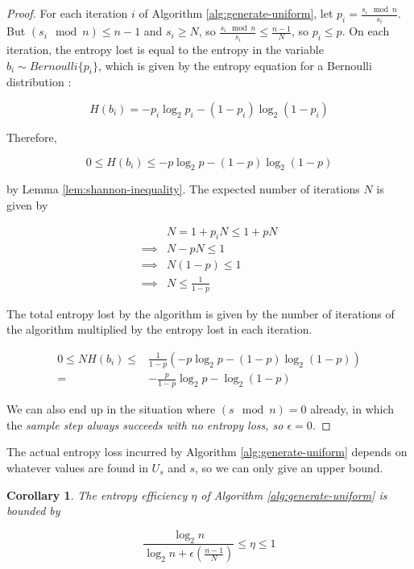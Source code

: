 \documentclass[12pt]{article}
\newtheorem{corollary}{Corollary}
\begin{document}
\begin{proof}
For each iteration $i$ of Algorithm \ref{alg:generate-uniform}, let $p_i = \frac{s_i \mod n}{s_i}$. But $(s_i \mod n) \le n-1$ and $s_i \ge N$, so $\frac{s_i \mod n}{s_i} \le \frac{n-1}{N}$, so $p_i \le p$. On each iteration, the entropy lost is equal to the entropy in the variable $b_i \sim Bernoulli\{p_i\}$, which is given by the entropy equation for a Bernoulli distribution \cite{cover1999elements}:

\begin{equation}
H(b_i) = -p_i\log_2p_i - (1-p_i)\log_2(1-p_i)
\end{equation}

Therefore, 

\begin{equation}
0 \le H(b_i) \le -p\log_2p - (1-p)\log_2(1-p) 
\end{equation}

by Lemma \ref{lem:shannon-inequality}. The expected number of iterations $N$ is given by

\begin{align}
& N = 1 + p_iN \le 1 + pN \\
\implies & N-pN \le 1 \\
\implies & N(1-p) \le 1 \\
\implies & N \le \frac{1}{1-p}
\end{align}

The total entropy lost by the algorithm is given by the number of iterations of the algorithm multiplied by the entropy lost in each iteration.

\begin{align}
0 \le NH(b_i) \le & \frac{1}{1-p}(-p\log_2p - (1-p)\log_2(1-p) ) \\
= & -\frac{p}{1-p}\log_2p - \log_2(1-p)
\end{align}

We can also end up in the situation where $(s \mod n) = 0$ already, in which the \em sample \em step always succeeds with no entropy loss, so $\epsilon=0$.
\end{proof}

The actual entropy loss incurred by Algorithm \ref{alg:generate-uniform} depends on whatever values are found in $U_s$ and $s$, so we can only give an upper bound.

\begin{corollary}
The entropy efficiency $\eta$ of Algorithm \ref{alg:generate-uniform} is bounded by

\begin{equation}
\frac{\log_2n}{\log_2n + \epsilon(\frac{n-1}{N})} \le \eta \le 1
\label{eq:generate-uniform-efficiency}
\end{equation}
\end{corollary}
\end{document}
